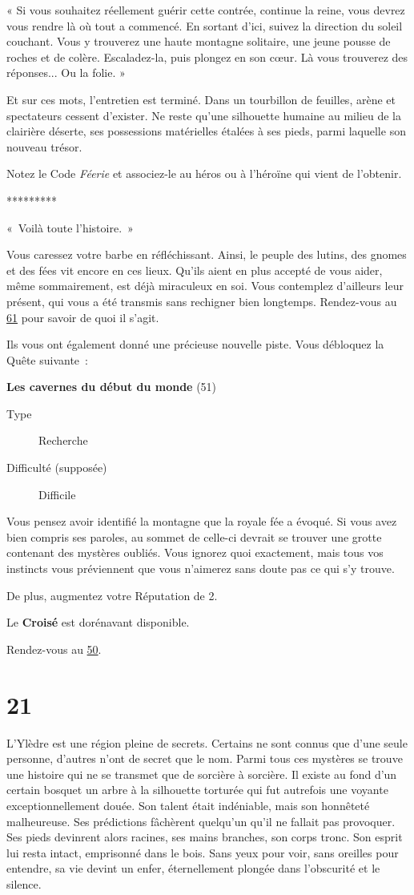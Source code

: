 \documentclass{report}
\newcommand{\gsection}[1]{
    \section{#1}
    \label{section-#1}
}
\newcommand{\glink}[1]{\hyperref[section-#1]{#1}}
\newcommand{\quest}[5]{
    \begin{mdframed}[innertopmargin=0.5cm,innerbottommargin=0.5cm,leftmargin=0.5cm,rightmargin=0.5cm]
        \begin{center}
            \textbf{#1} (#2)
        \end{center}
        \begin{description}
            \item[Type] #3
            \item[Difficulté (supposée)] #4
        \end{description}
        #5
    \end{mdframed}
}
\newcommand{\ellipse}{
    \begin{center}
        *********
    \end{center}
}
\newcommand{\hero}[1]{\textbf{#1}}
\begin{document}
« Si vous souhaitez réellement guérir cette contrée, continue la reine, vous devrez vous rendre là où tout a commencé. En sortant d'ici, suivez la direction du soleil couchant. Vous y trouverez une haute montagne solitaire, une jeune pousse de roches et de colère. Escaladez-la, puis plongez en son cœur. Là vous trouverez des réponses... Ou la folie. »

Et sur ces mots, l'entretien est terminé. Dans un tourbillon de feuilles, arène et spectateurs cessent d'exister. Ne reste qu'une silhouette humaine au milieu de la clairière déserte, ses possessions matérielles étalées à ses pieds, parmi laquelle son nouveau trésor.

Notez le Code \emph{Féerie} et associez-le au héros ou à l'héroïne qui vient de l'obtenir.

\ellipse

« Voilà toute l'histoire. »

Vous caressez votre barbe en réfléchissant. Ainsi, le peuple des lutins, des gnomes et des fées vit encore en ces lieux. Qu'ils aient en plus accepté de vous aider, même sommairement, est déjà miraculeux en soi. Vous contemplez d'ailleurs leur présent, qui vous a été transmis sans rechigner bien longtemps. Rendez-vous au \glink{61} pour savoir de quoi il s'agit.

Ils vous ont également donné une précieuse nouvelle piste. Vous débloquez la Quête suivante :

\quest{Les cavernes du début du monde}{51}{Recherche}{Difficile}{
Vous pensez avoir identifié la montagne que la royale fée a évoqué. Si vous avez bien compris ses paroles, au sommet de celle-ci devrait se trouver une grotte contenant des mystères oubliés. Vous ignorez quoi exactement, mais tous vos instincts vous préviennent que vous n'aimerez sans doute pas ce qui s'y trouve.
}

De plus, augmentez votre Réputation de 2.

Le \hero{Croisé} est dorénavant disponible.

Rendez-vous au \glink{50}.

\gsection{21}

L'Ylèdre est une région pleine de secrets. Certains ne sont connus que d'une seule personne, d'autres n'ont de secret que le nom. Parmi tous ces mystères se trouve une histoire qui ne se transmet que de sorcière à sorcière. Il existe au fond d'un certain bosquet un arbre à la silhouette torturée qui fut autrefois une voyante exceptionnellement douée. Son talent était indéniable, mais son honnêteté malheureuse. Ses prédictions fâchèrent quelqu'un qu'il ne fallait pas provoquer. Ses pieds devinrent alors racines, ses mains branches, son corps tronc. Son esprit lui resta intact, emprisonné dans le bois. Sans yeux pour voir, sans oreilles pour entendre, sa vie devint un enfer, éternellement plongée dans l'obscurité et le silence.
\end{document}
